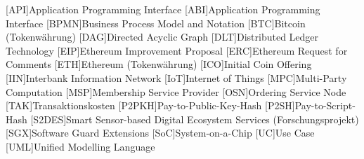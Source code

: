 \documentclass[paper=a4,
fontsize=12pt,
toc=listof,
bibliography=totoc,
numbers=noendperiod %
]{scrreprt}
\newcounter{savepage}
\begin{document}
\begin{acronym}[Abkürzungen] %
[API]{Application Programming Interface}
[ABI]{Application Programming Interface}
[BPMN]{Business Process Model and Notation}
[BTC]{Bitcoin (Tokenwährung)}
[DAG]{Directed Acyclic Graph}
[DLT]{Distributed Ledger Technology}
[EIP]{Ethereum Improvement Proposal}
[ERC]{Ethereum Request for Comments}
[ETH]{Ethereum (Tokenwährung)}
[ICO]{Initial Coin Offering}
[IIN]{Interbank Information Network}
[IoT]{Internet of Things}
[MPC]{Multi-Party Computation}
[MSP]{Membership Service Provider}
[OSN]{Ordering Service Node}
[TAK]{Transaktionskosten}
[P2PKH]{Pay-to-Public-Key-Hash}
[P2SH]{Pay-to-Script-Hash}
[S2DES]{Smart Sensor-based Digital Ecosystem Services (Forschungsprojekt)}
[SGX]{Software Guard Extensions}
[SoC]{System-on-a-Chip}
[UC]{Use Case}
[UML]{Unified Modelling Language}
\end{acronym}

\newpage





\newpage
{}
\setcounter{page}{\thesavepage}
\appendix
\renewcommand*\chapterformat{Anhang \thechapter:\enskip}
%
%
%

\clearpage
\singlespacing
\printbibliography[title=Literaturverzeichnis]
\onehalfspacing

\newpage
\clearpage



\end{document}
